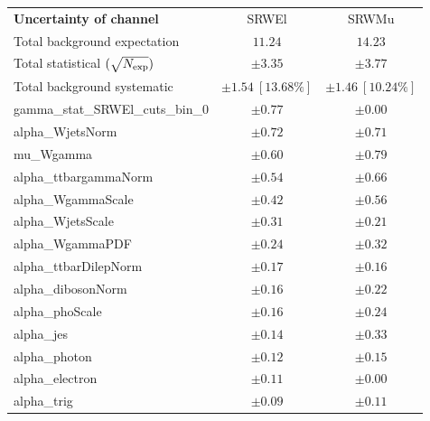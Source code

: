 
\begin{table}
\begin{center}
\setlength{\tabcolsep}{0.0pc}
\begin{tabular*}{\textwidth}{@{\extracolsep{\fill}}lcc}
\noalign{\smallskip}\hline\noalign{\smallskip}
{\bf Uncertainty of channel}                                    & SRWEl            & SRWMu            \\
\noalign{\smallskip}\hline\noalign{\smallskip}
Total background expectation             &  $11.24$        &  $14.23$       \\
\noalign{\smallskip}\hline\noalign{\smallskip}
Total statistical $(\sqrt{N_{\rm exp}})$              & $\pm 3.35$        & $\pm 3.77$       \\
Total background systematic               & $\pm 1.54\ [13.68\%] $        & $\pm 1.46\ [10.24\%] $             \\
\noalign{\smallskip}\hline\noalign{\smallskip}
\noalign{\smallskip}\hline\noalign{\smallskip}
gamma\_stat\_SRWEl\_cuts\_bin\_0         & $\pm 0.77$          & $\pm 0.00$       \\
alpha\_WjetsNorm         & $\pm 0.72$          & $\pm 0.71$       \\
mu\_Wgamma         & $\pm 0.60$          & $\pm 0.79$       \\
alpha\_ttbargammaNorm         & $\pm 0.54$          & $\pm 0.66$       \\
alpha\_WgammaScale         & $\pm 0.42$          & $\pm 0.56$       \\
alpha\_WjetsScale         & $\pm 0.31$          & $\pm 0.21$       \\
alpha\_WgammaPDF         & $\pm 0.24$          & $\pm 0.32$       \\
alpha\_ttbarDilepNorm         & $\pm 0.17$          & $\pm 0.16$       \\
alpha\_dibosonNorm         & $\pm 0.16$          & $\pm 0.22$       \\
alpha\_phoScale         & $\pm 0.16$          & $\pm 0.24$       \\
alpha\_jes         & $\pm 0.14$          & $\pm 0.33$       \\
alpha\_photon         & $\pm 0.12$          & $\pm 0.15$       \\
alpha\_electron         & $\pm 0.11$          & $\pm 0.00$       \\
alpha\_trig         & $\pm 0.09$          & $\pm 0.11$       \\

\end{tabular*}
\end{center}
\end{table}
